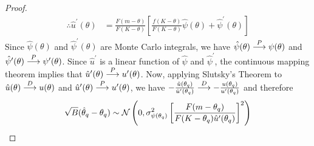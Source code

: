 \begin{proof}
\begin{align*}
        \therefore \hat{u}^\prime(\theta) &= \frac{F(m-\theta)}{F(K-\theta)} \left[ \frac{f(K-\theta)}{F(K-\theta)} \hat\psi(\theta) +\hat\psi^\prime(\theta) \right]
    \end{align*}
    Since $\hat\psi(\theta)$ and $\hat\psi^\prime(\theta)$ are Monte Carlo integrals, we have $\hat\psi(\theta) \overset{P}{\longrightarrow} \psi(\theta)$ and $\hat\psi^\prime(\theta) \overset{P}{\longrightarrow} \psi^\prime(\theta)$. Since $\hat{u}^\prime$ is a linear function of $\hat\psi$ and $\hat\psi^\prime$, the continuous mapping theorem implies that $\hat{u}^\prime(\theta) \overset{P}{\longrightarrow} u^\prime(\theta)$.
    Now, applying Slutsky's Theorem to $\hat{u}(\theta) \overset{D}{\longrightarrow} u(\theta)$ and $\hat{u}^\prime(\theta) \overset{P}{\longrightarrow} u^\prime(\theta)$, we have $-\frac{\hat{u}(\theta_q)}{\hat{u}^\prime(\theta_q)} \overset{D}{\longrightarrow} -\frac{{u}(\theta_q)}{{u}^\prime(\theta_q)}$ and therefore \begin{equation}
        \sqrt{B}(\hat\theta_q - \theta_q) \sim \mathcal{N} \left(0, \sigma^2_{\psi(\theta_q)} \left[ \frac{F(m-\theta_q)}{F(K-\theta_q)\hat{u}^\prime(\theta_q)} \right]^2 \right)
    \end{equation}
\end{proof}
